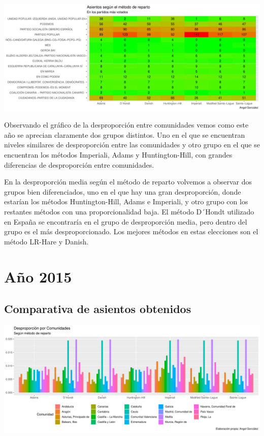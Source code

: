 \documentclass[12pt,a4paper,]{book}
\numberwithin{dummy}{section}
\theoremstyle{ocrenumbox}
\theoremstyle{blacknumex}
\theoremstyle{blacknumbox}
\theoremstyle{ocrenum}
\theoremstyle{ocrenum}
\begin{document}
\begin{center}\includegraphics[width=1\linewidth]{figurasR/unnamed-chunk-109-2} \end{center}

Observando el gráfico de la desproporción entre comunidades vemos como
este año se aprecian claramente dos grupos distintos. Uno en el que se
encuentran niveles similares de desproporción entre las comunidades y
otro grupo en el que se encuentran los métodos Imperiali, Adams y
Huntington-Hill, con grandes diferencias de desproporción entre
comunidades.

En la desproporción media según el método de reparto volvemos a observar
dos grupos bien diferenciados, uno en el que hay una gran desproporción,
donde estarían los métodos Huntington-Hill, Adams e Imperiali, y otro
grupo con los restantes métodos con una proporcionalidad baja. El método
D´Hondt utilizado en España se encontraría en el grupo de desproporción
media, pero dentro del grupo es el más desproporcionado. Los mejores
métodos en estas elecciones son el método LR-Hare y Danish.

\hypertarget{auxf1o-2015}{%
\section{Año 2015}\label{auxf1o-2015}}

\hypertarget{comparativa-de-asientos-obtenidos-11}{%
\subsection{Comparativa de asientos
obtenidos}\label{comparativa-de-asientos-obtenidos-11}}

\begin{center}\includegraphics[width=1\linewidth]{figurasR/unnamed-chunk-111-1} \end{center}
\end{document}
